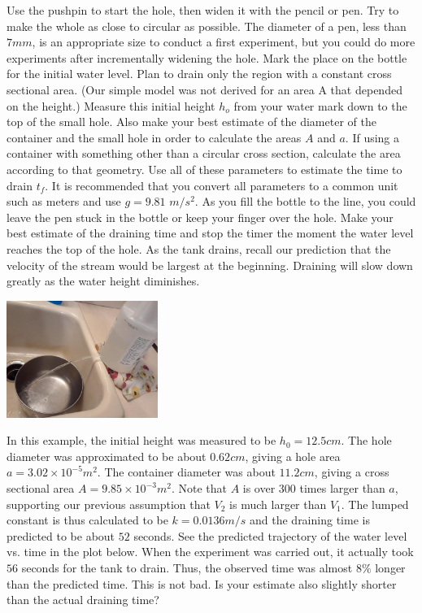 \documentclass{ximera}
\begin{document}
Use the pushpin to start the hole, then widen it with the pencil or pen.  Try to make the whole as close to circular as possible.  The diameter of a pen, less than $7mm$, is an appropriate size to conduct a first experiment, but you could do more experiments after incrementally widening the hole.  Mark the place on the bottle for the initial water level.  Plan to drain only the region with a constant cross sectional area.  (Our simple model was not derived for an area A that depended on the height.)  Measure this initial height $h_o$ from your water mark down to the top of the small hole.  Also make your best estimate of the diameter of the container and the small hole in order to calculate the areas $A$ and $a$.  If using a container with something other than a circular cross section, calculate the area according to that geometry.  Use all of these parameters to estimate the time to drain $t_f$.  It is recommended that you convert all parameters to a common unit such as meters and use $g=9.81$ $m/s^2$.  As you fill the bottle to the line, you could leave the pen stuck in the bottle or keep your finger over the hole.  Make your best estimate of the draining time and stop the timer the moment the water level reaches the top of the hole.  As the tank drains, recall our prediction that the velocity of the stream would be largest at the beginning.  Draining will slow down greatly as the water height diminishes. 
 
\begin{image}
 \includegraphics[height=1.5in]{sink.jpg}
\end{image}
 
In this example, the initial height was measured to be $h_0=12.5 cm$.  The hole diameter was approximated to be about $0.62 cm$, giving a hole area $a=3.02\times 10^{-5} m^2$.  The container diameter was about $11.2 cm$, giving a cross sectional area $A=9.85\times 10^{-3} m^2$.  Note that $A$ is over $300$ times larger than $a$, supporting our previous assumption that $V_2$ is much larger than $V_1$.  The lumped constant is thus calculated to be $k=0.0136 m/s$ and the draining time is predicted to be about $52$ seconds.  See the predicted trajectory of the water level vs. time in the plot below.  When the experiment was carried out, it actually took $56$ seconds for the tank to drain.  Thus, the observed time was almost $8\%$ longer than the predicted time.  This is not bad.  Is your estimate also slightly shorter than the actual draining time?
 
\end{document}
